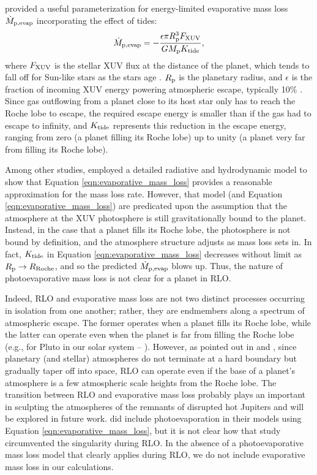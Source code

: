 \documentclass{svjour3}                     %
\begin{document}
\cite{Erkaev2007Roche} provided a useful parameterization for energy-limited evaporative mass loss $\dot{M}_{\rm p, evap}$ incorporating the effect of tides:
\begin{equation}
\dot{M}_{\rm p, evap} = -\frac{\epsilon \pi R_{\rm p}^3 F_{\rm XUV}}{G M_{\rm p} K_{\rm tide}},
\label{eqn:evaporative_mass_loss}
\end{equation}
where $F_{\rm XUV}$ is the stellar XUV flux at the distance of the planet, which tends to fall off for Sun-like stars as the stars age \cite{Ribas2005Evolution}. $R_{\rm p}$ is the planetary radius, and $\epsilon$ is the fraction of incoming XUV energy powering atmospheric escape, typically 10\% \cite{Owen2012Planetary}. Since gas outflowing from a planet close to its host star only has to reach the Roche lobe to escape, the required escape energy is smaller than if the gas had to escape to infinity, and $K_{\rm tide}$ represents this reduction in the escape energy, ranging from zero (a planet filling its Roche lobe) up to unity (a planet very far from filling its Roche lobe). 

Among other studies, \cite{2009ApJ...693...23M} employed a detailed radiative and hydrodynamic model to show that Equation \ref{eqn:evaporative_mass_loss} provides a reasonable approximation for the mass loss rate. However, that model (and Equation \ref{eqn:evaporative_mass_loss}) are predicated upon the assumption that the atmosphere at the XUV photosphere is still gravitationally bound to the planet. Instead, in the case that a planet fills its Roche lobe, the photosphere is not bound by definition, and the atmosphere structure adjusts as mass loss sets in. In fact, $K_{\rm tide}$ in Equation \ref{eqn:evaporative_mass_loss} decreases without limit as $R_{\rm p} \rightarrow R_{\rm Roche}$, and so the predicted $\dot{M}_{\rm p, evap}$ blows up. Thus, the nature of photoevaporative mass loss is not clear for a planet in RLO. 

Indeed, RLO and evaporative mass loss are not two distinct processes occurring in isolation from one another; rather, they are endmembers along a spectrum of atmospheric escape. The former operates when a planet fills its Roche lobe, while the latter can operate even when the planet is far from filling the Roche lobe (e.g., for Pluto in our solar system -- \cite{Watson1981Dynamics}). However, as pointed out in \cite{Ritter1988Turning} and \cite{Li2010WASP12b}, since planetary (and stellar) atmospheres do not terminate at a hard boundary but gradually taper off into space, RLO can operate even if the base of a planet's atmosphere is a few atmospheric scale heights from the Roche lobe. The transition between RLO and evaporative mass loss probably plays an important in sculpting the atmospheres of the remnants of disrupted hot Jupiters and will be explored in future work. \cite{2015ApJ...813..101V} did include photoevaporation in their models using Equation \ref{eqn:evaporative_mass_loss}, but it is not clear how that study circumvented the singularity during RLO. In the absence of a photoevaporative mass loss model that clearly applies during RLO, we do not include evaporative mass loss in our calculations.
\end{document}
